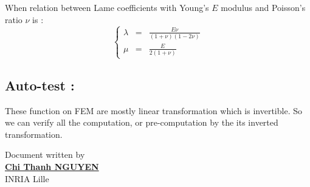 \documentclass[a4paper,10pt]{article}
\begin{document}
When relation between Lame coefficients with Young's $E$ modulus and Poisson's ratio $\nu$ is :
\[
\left\{ 
\begin{array}{ccc}
      \lambda   &=& \frac{E\nu}{(1+\nu)(1-2\nu)}                           \\ 
           \mu  &=& \frac{E}{2(1+\nu)}           
\end{array}\right.
\]


\subsection{Auto-test : }
These function on FEM are mostly linear transformation which is invertible. So we can verify all the computation, or pre-computation by the its inverted transformation. 


						      \begin{flushright}
						      Document written by \\
						      \href{mailto:chi-thanh.nguyen@inria.fr}{{\textbf {Chi Thanh NGUYEN}}} \\
						      INRIA Lille
						      \end{flushright}



\end{document}
